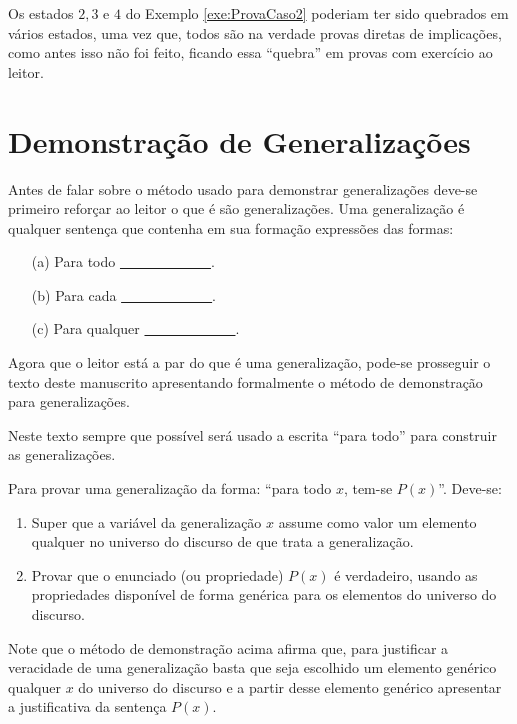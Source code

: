 \begin{rema}
	Os estados $2, 3$ e $4$ do Exemplo \ref{exe:ProvaCaso2} poderiam ter sido quebrados em vários estados, uma vez que, todos são na verdade provas diretas de implicações, como antes isso não foi feito, ficando essa ``quebra'' em provas com exercício ao leitor.
\end{rema}

\section{Demonstração de Generalizações}\label{sec:DemonstracaoGeneralizacao}

Antes de falar sobre o método usado para demonstrar generalizações deve-se primeiro reforçar ao leitor o que é são generalizações. Uma generalização é qualquer sentença que contenha em sua formação expressões das formas: 
\begin{itemize}
	\item[(a)] Para todo \underline{\ \ \ \ \ \ \ \ \ \ \ \ \ }.
	\item[(b)] Para cada \underline{\ \ \ \ \ \ \ \ \ \ \ \ \ }.
	\item[(c)] Para qualquer \underline{\ \ \ \ \ \ \ \ \ \ \ \ \ }.
\end{itemize}
Agora que o leitor está a par do que é uma generalização, pode-se prosseguir o texto deste manuscrito apresentando formalmente o método de demonstração para generalizações.

\begin{rema}
	Neste texto sempre que possível será usado a escrita ``para todo'' para construir as generalizações.
\end{rema}

\begin{method}
	Para provar uma generalização da forma: ``para todo $x$, tem-se $P(x)$''. Deve-se:
	\begin{enumerate}
		\item Super que a variável da generalização $x$ assume como valor um elemento qualquer no universo do discurso de que trata a  generalização.
		\item Provar que o enunciado (ou propriedade) $P(x)$ é verdadeiro, usando as propriedades disponível de forma genérica para os elementos do universo do discurso.
	\end{enumerate}
\end{method}

Note que o método de demonstração acima afirma que, para justificar a veracidade de uma generalização basta que seja escolhido um elemento genérico qualquer $x$ do universo do discurso e a partir desse elemento genérico apresentar a justificativa da sentença $P(x)$.

